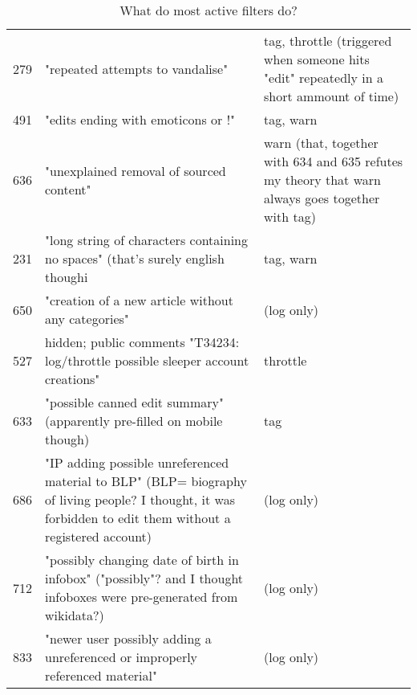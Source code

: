 \begin{table*}
\begin{tabular}{r p{10cm} p{5cm} }
      279 & "repeated attempts to vandalise" & tag, throttle (triggered when someone hits "edit" repeatedly in a short ammount of time) \\
      491 & "edits ending with emoticons or !" & tag, warn \\
      636 & "unexplained removal of sourced content" & warn (that, together with 634 and 635 refutes my theory that warn always goes together with tag) \\
      231 & "long string of characters containing no spaces" (that's surely english though^^) & tag, warn \\
      650 & "creation of a new article without any categories" & (log only) \\
      527 & hidden; public comments "T34234: log/throttle possible sleeper account creations" & throttle \\
      633 & "possible canned edit summary" (apparently pre-filled on mobile though) & tag \\
      686 & "IP adding possible unreferenced material to BLP" (BLP= biography of living people? I thought, it was forbidden to edit them without a registered account) & (log only) \\
      712 & "possibly changing date of birth in infobox" ("possibly"? and I thought infoboxes were pre-generated from wikidata?) & (log only) \\
      833 & "newer user possibly adding a unreferenced or improperly referenced material" & (log only) \\
  \end{tabular}
  \caption{What do most active filters do?}~\label{tab:most-active-actions}
\end{table*}

\begin{comment}
It is not, as some seem to believe, intended to block profanity in articles (that would be extraordinarily dim), nor even to revert page-blankings. That's what we have ClueBot and TawkerBot for, and they do a damn good job of it. This is a different tool, for different situations, which require different responses. I conceive that filters in this extension would be triggered fewer times than once every few hours. — Werdna • talk 13:23, 9 July 2008 (UTC) "
// longer clarification what is to be targeted. interestingly enough, I think the bulk of the things that are triggered today are precisely the ones Werdna points out as "we are not targeting them".
\end{comment}

